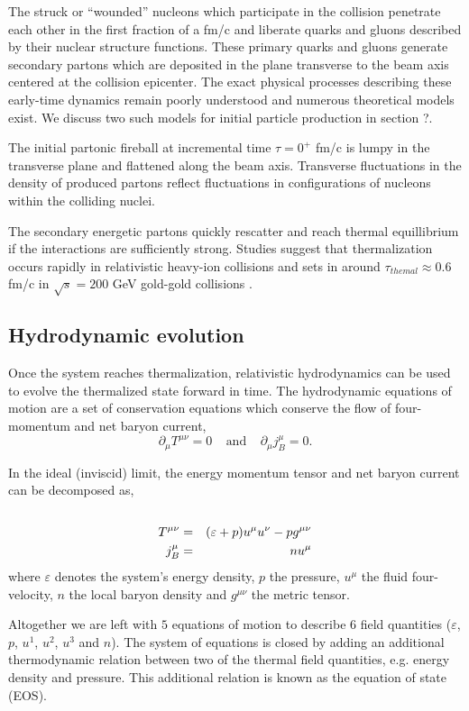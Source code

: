 \documentclass[aps,prc,reprint,amsmath,nofootinbib]{revtex4-1}
\begin{document}
The struck or ``wounded'' nucleons which participate in the collision penetrate each other in the first fraction of a fm/c and liberate quarks and gluons described by 
their nuclear structure functions. These primary quarks and gluons generate secondary partons which are deposited in the plane transverse to the beam axis centered 
at the collision epicenter. The exact physical processes describing these early-time dynamics remain poorly understood and numerous theoretical models exist. We 
discuss two such models for initial particle production in section ?. 

The initial partonic fireball at incremental time $\tau=0^+$ fm/c is lumpy in the transverse plane and flattened along the beam axis. Transverse fluctuations in the 
density of produced partons reflect fluctuations in configurations of nucleons within the colliding nuclei. 

The secondary energetic partons quickly rescatter and reach thermal equillibrium if the interactions are sufficiently strong. Studies suggest that thermalization 
occurs rapidly in relativistic heavy-ion collisions and sets in around $\tau_{themal} \approx 0.6$ fm/c in $\sqrt{s} = 200$ GeV gold-gold collisions \cite{Heinz:2001xi}.

\subsection{Hydrodynamic evolution}

Once the system reaches thermalization, relativistic hydrodynamics can be used to evolve the thermalized state forward in time. The hydrodynamic equations of motion 
are a set of conservation equations which conserve the flow of four-momentum and net baryon current,
\begin{equation}
 \partial_\mu T^{\mu\nu} = 0 ~~~~~\mbox{and}~~~~~ \partial_\mu j_B^\mu = 0.
\end{equation}

In the ideal (inviscid) limit, the energy momentum tensor and net baryon current can be decomposed as,
\begin{eqnarray}
 \cr T^{\mu\nu} &=& (\varepsilon + p) u^\mu u^\nu - p g^{\mu\nu} \\
 j_B^\mu &=& n u^\mu
\end{eqnarray}
where $\varepsilon$ denotes the system's energy density, $p$ the pressure, $u^\mu$ the fluid four-velocity, $n$ the local baryon density and $g^{\mu\nu}$ the metric 
tensor.

Altogether we are left with $5$ equations of motion to describe $6$ field quantities ($\varepsilon$, $p$, $u^1$, $u^2$, $u^3$ and $n$).
The system of equations is closed by adding an additional thermodynamic relation between two of the thermal field quantities, e.g. energy density and pressure. 
This additional relation is known as the equation of state (EOS).
\end{document}
